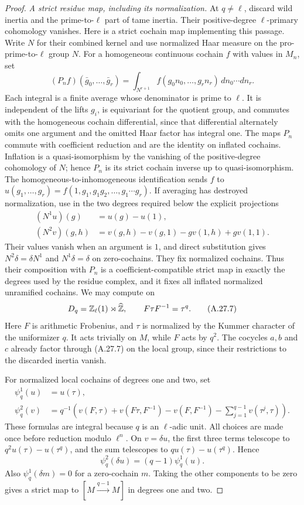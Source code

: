 \begin{proof}
\emph{A strict residue map, including its normalization.}
At $q\ne\ell$, discard wild inertia and the prime-to-$\ell$
part of tame inertia. Their positive-degree $\ell$-primary
cohomology vanishes. Here is a strict cochain map implementing
this passage. Write $N$ for their combined kernel and use
normalized Haar measure on the pro-prime-to-$\ell$ group $N$.
For a homogeneous continuous cochain $f$ with values in $M_n$,
set
\[
 (P_nf)(\bar g_0,\ldots,\bar g_r)
   =\int_{N^{r+1}} f(g_0n_0,\ldots,g_rn_r)\,
                                  dn_0\cdots dn_r.
 \tag{A.27.7a}
\]
Each integral is a finite average whose denominator is prime
to $\ell$. It is independent of the lifts $g_i$, is equivariant
for the quotient group, and commutes with the homogeneous
cochain differential, since that differential alternately
omits one argument and the omitted Haar factor has integral
one. The maps $P_n$ commute with coefficient reduction and
are the identity on inflated cochains. Inflation is a
quasi-isomorphism by the vanishing of the positive-degree
cohomology of $N$; hence $P_n$ is its strict cochain inverse
up to quasi-isomorphism. The homogeneous-to-inhomogeneous
identification sends $f$ to
$u(g_1,\ldots,g_r)=f(1,g_1,g_1g_2,\ldots,g_1\cdots g_r)$.
If averaging has destroyed normalization, use in the two
degrees required below the explicit projections
\[
 \begin{split}
 (N^1u)(g)&=u(g)-u(1),\\
 (N^2v)(g,h)&=v(g,h)-v(g,1)-g v(1,h)+g v(1,1).
 \end{split}
 \tag{A.27.7b}
\]
Their values vanish when an argument is $1$, and direct
substitution gives $N^2\delta=\delta N^1$ and
$N^1\delta=\delta$ on zero-cochains. They fix normalized
cochains. Thus their composition with $P_n$ is a
coefficient-compatible strict map in exactly the degrees
used by the residue complex, and it fixes all inflated
normalized unramified cochains. We may compute on
\[
 D_q=\mathbb Z_\ell(1)\rtimes\widehat{\mathbb Z},
 \qquad F\tau F^{-1}=\tau^q.
 \tag{A.27.7}
\]
Here $F$ is arithmetic Frobenius, and $\tau$ is normalized by
the Kummer character of the uniformizer $q$. It acts trivially
on $M$, while $F$ acts by $q^2$. The cocycles $a,b$ and $c$
already factor through (A.27.7) on the local group, since
their restrictions to the discarded inertia vanish.

For normalized local cochains of degrees one and two, set
\[
 \begin{split}
 \psi_q^1(u)&=u(\tau),\\
 \psi_q^2(v)&=q^{-1}\left(
 v(F,\tau)+v(F\tau,F^{-1})-v(F,F^{-1})
       -\sum_{j=1}^{q-1}v(\tau^j,\tau)\right).
 \end{split}
 \tag{A.27.8}
\]
These formulas are integral because $q$ is an $\ell$-adic
unit. All choices are made once before reduction modulo
$\ell^n$. On $v=\delta u$, the first three terms telescope
to $q^2u(\tau)-u(\tau^q)$, and the sum telescopes to
$q u(\tau)-u(\tau^q)$. Hence
\[
 \psi_q^2(\delta u)=(q-1)\psi_q^1(u).
 \tag{A.27.9}
\]
Also $\psi_q^1(\delta m)=0$ for a zero-cochain $m$.
Taking the other components to be zero gives a strict map to
$[M\xrightarrow{q-1}M]$ in degrees one and two.


\end{proof}

